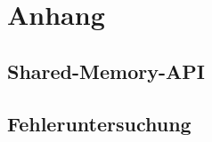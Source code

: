 
\section*{Anhang}
\renewcommand{\thesubsection}{\Alph{subsection}}
\subsection{Shared-Memory-API} \label{anhang:sharedMemApi}


\begin{landscape}
\subsection{Fehleruntersuchung}\label{anhang:error_analysis}
\end{landscape}

                    


    






   